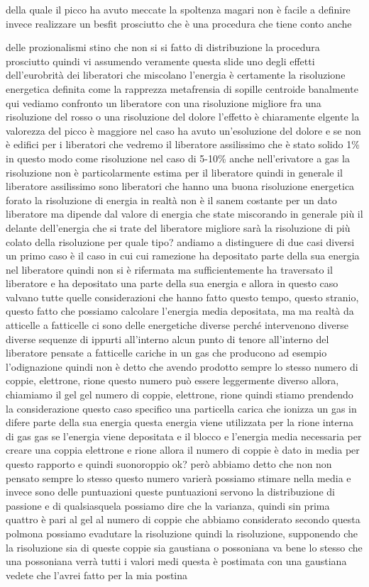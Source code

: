 della quale il picco ha avuto meccate la spoltenza magari non è facile a definire invece realizzare un besfit prosciutto che è una procedura che tiene conto anche 

delle prozionalismi stino che non si si fatto di distribuzione la procedura prosciutto quindi vi assumendo veramente questa slide uno degli effetti dell'eurobrità dei liberatori che miscolano l'energia è certamente la risoluzione energetica definita come la rapprezza metafrensia di sopille centroide banalmente qui vediamo confronto un liberatore con una risoluzione migliore fra una risoluzione del rosso o una risoluzione del dolore l'effetto è chiaramente elgente la valorezza del picco è maggiore nel caso ha avuto un'esoluzione del dolore e se non è edifici per i liberatori che vedremo il liberatore assilissimo che è stato solido 1\% in questo modo come risoluzione nel caso di 5-10\% anche nell'erivatore a gas la risoluzione non è particolarmente estima per il liberatore quindi in generale il liberatore assilissimo sono liberatori che hanno una buona risoluzione energetica forato la risoluzione di energia in realtà non è il sanem costante per un dato liberatore ma dipende dal valore di energia che state miscorando in generale più il delante dell'energia che si trate del liberatore migliore sarà la risoluzione di più colato della risoluzione per quale tipo? andiamo a distinguere di due casi diversi un primo caso è il caso in cui cui ramezione ha depositato parte della sua energia nel liberatore quindi non si è rifermata ma sufficientemente ha traversato il liberatore e ha depositato una parte della sua energia e allora in questo caso valvano tutte quelle considerazioni che hanno fatto questo tempo, questo stranio, questo fatto che possiamo calcolare l'energia media depositata, ma ma realtà da atticelle a fatticelle ci sono delle energetiche diverse perché intervenono diverse diverse sequenze di ippurti all'interno alcun punto di tenore all'interno del liberatore pensate a fatticelle cariche in un gas che producono ad esempio l'odignazione quindi non è detto che avendo prodotto sempre lo stesso numero di coppie, elettrone, rione questo numero può essere leggermente diverso allora, chiamiamo il gel gel numero di coppie, elettrone, rione quindi stiamo prendendo la considerazione questo caso specifico una particella carica che ionizza un gas in difere parte della sua energia questa energia viene utilizzata per la rione interna di gas gas se l'energia viene depositata e il blocco e l'energia media necessaria per creare una coppia elettrone e rione allora il numero di coppie è dato in media per questo rapporto e quindi suonoroppio ok? però abbiamo detto che non non pensato sempre lo stesso questo numero varierà possiamo stimare nella media e invece sono delle puntuazioni queste puntuazioni servono la distribuzione di passione e di qualsiasquela possiamo dire che la varianza, quindi sin prima quattro è pari al gel al numero di coppie che abbiamo considerato secondo questa polmona possiamo evadutare la risoluzione quindi la risoluzione, supponendo che la risoluzione sia di queste coppie sia gaustiana o possoniana va bene lo stesso che una possoniana verrà tutti i valori medi questa è postimata con una gaustiana vedete che l'avrei fatto per la mia postina 